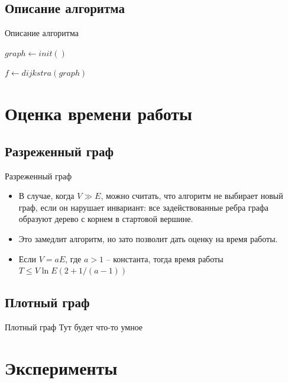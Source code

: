 \documentclass{beamer}
\begin{document}
 \subsection{Описание алгоритма}
 \begin{frame}{Описание алгоритма}
  \begin{algorithm}[H]
  
  $graph \gets init()$
  
  $f \gets dijkstra(graph)$
  
  \end{algorithm}
 \end{frame}
 
 \section{Оценка времени работы}
 \subsection{Разреженный граф}
 \begin{frame}{Разреженный граф}
  \begin{itemize}
   \item В случае, когда $V \gg E$, можно считать, что алгоритм не выбирает новый граф, если он нарушает инвариант: все задействованные ребра графа образуют дерево с корнем в стартовой вершине.
   \item Это замедлит алгоритм, но зато позволит дать оценку на время работы.
   \item Если $V = aE$, где $a > 1$ -- константа, тогда время работы $T \le V \ln{E} \left(2 + 1/(a - 1)\right)$
  \end{itemize}
 \end{frame}

 \subsection{Плотный граф}
 \begin{frame}{Плотный граф}
  Тут будет что-то умное
 \end{frame}
 
 \section{Эксперименты}
\end{document}
